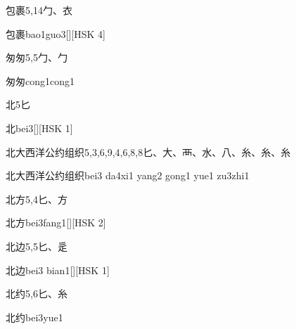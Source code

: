\begin{entry}{包裹}{5,14}{⼓、⾐}
  \begin{phonetics}{包裹}{bao1guo3}[][HSK 4]
  \end{phonetics}
\end{entry}

\begin{entry}{匆匆}{5,5}{⼓、⼓}
  \begin{phonetics}{匆匆}{cong1cong1}
  \end{phonetics}
\end{entry}

\begin{entry}{北}{5}{⼔}
  \begin{phonetics}{北}{bei3}[][HSK 1]
  \end{phonetics}
\end{entry}

\begin{entry}{北大西洋公约组织}{5,3,6,9,4,6,8,8}{⼔、⼤、⾑、⽔、⼋、⽷、⽷、⽷}
  \begin{phonetics}{北大西洋公约组织}{bei3 da4xi1 yang2 gong1 yue1 zu3zhi1}
  \end{phonetics}
\end{entry}

\begin{entry}{北方}{5,4}{⼔、⽅}
  \begin{phonetics}{北方}{bei3fang1}[][HSK 2]
  \end{phonetics}
\end{entry}

\begin{entry}{北边}{5,5}{⼔、⾡}
  \begin{phonetics}{北边}{bei3 bian1}[][HSK 1]
  \end{phonetics}
\end{entry}

\begin{entry}{北约}{5,6}{⼔、⽷}
  \begin{phonetics}{北约}{bei3yue1}
  \end{phonetics}
\end{entry}

